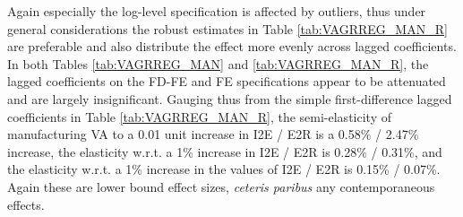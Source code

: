 \documentclass[a4paper]{article}
\begin{document}

Again especially the log-level specification is affected by outliers, thus under general considerations the robust estimates in Table \ref{tab:VAGRREG_MAN_R} are preferable and also distribute the effect more evenly across lagged coefficients. In both Tables \ref{tab:VAGRREG_MAN} and \ref{tab:VAGRREG_MAN_R}, the lagged coefficients on the FD-FE and FE specifications appear to be attenuated and are largely insignificant. Gauging thus from the simple first-difference lagged coefficients in  Table \ref{tab:VAGRREG_MAN_R}, the semi-elasticity of manufacturing VA to a 0.01 unit increase in I2E / E2R is a 0.58\% / 2.47\% increase, the elasticity w.r.t. a 1\% increase in I2E / E2R is 0.28\% / 0.31\%, and the elasticity w.r.t. a 1\% increase in the values of I2E / E2R is 0.15\% / 0.07\%. Again these are lower bound effect sizes, \textit{ceteris paribus} any contemporaneous effects. \newline



\end{document}
